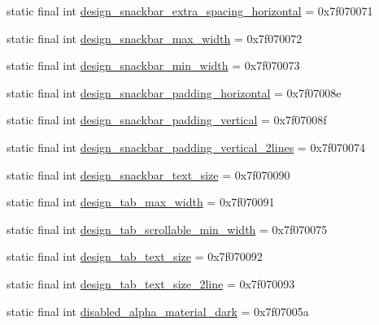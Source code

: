 \begin{CompactItemize}
\item 
static final int \hyperlink{classandroid_1_1support_1_1transition_1_1_r_1_1dimen_5ebad2bd37ab666c95fff511ee6636b7}{design\_\-snackbar\_\-extra\_\-spacing\_\-horizontal} = 0x7f070071
\item 
static final int \hyperlink{classandroid_1_1support_1_1transition_1_1_r_1_1dimen_a02014f40c29db95144e3f3e8d8f92e4}{design\_\-snackbar\_\-max\_\-width} = 0x7f070072
\item 
static final int \hyperlink{classandroid_1_1support_1_1transition_1_1_r_1_1dimen_9631affd0de312fd8cc56cbd449934b7}{design\_\-snackbar\_\-min\_\-width} = 0x7f070073
\item 
static final int \hyperlink{classandroid_1_1support_1_1transition_1_1_r_1_1dimen_b65c7898e9e3c80676fdcb000f5accf1}{design\_\-snackbar\_\-padding\_\-horizontal} = 0x7f07008e
\item 
static final int \hyperlink{classandroid_1_1support_1_1transition_1_1_r_1_1dimen_8cb554fc28af17eda83b8848c6c27c08}{design\_\-snackbar\_\-padding\_\-vertical} = 0x7f07008f
\item 
static final int \hyperlink{classandroid_1_1support_1_1transition_1_1_r_1_1dimen_4ea1e56c37b8ff5e5019e72d051429b9}{design\_\-snackbar\_\-padding\_\-vertical\_\-2lines} = 0x7f070074
\item 
static final int \hyperlink{classandroid_1_1support_1_1transition_1_1_r_1_1dimen_bf3cd2122839c0f8879ec2aa377a8c40}{design\_\-snackbar\_\-text\_\-size} = 0x7f070090
\item 
static final int \hyperlink{classandroid_1_1support_1_1transition_1_1_r_1_1dimen_de8b530feda19ef90b21416d142fe2fa}{design\_\-tab\_\-max\_\-width} = 0x7f070091
\item 
static final int \hyperlink{classandroid_1_1support_1_1transition_1_1_r_1_1dimen_b9d9d91766fb6e857956ad5469bd60af}{design\_\-tab\_\-scrollable\_\-min\_\-width} = 0x7f070075
\item 
static final int \hyperlink{classandroid_1_1support_1_1transition_1_1_r_1_1dimen_69603c05a14db0e4651bbc2f6cec96cb}{design\_\-tab\_\-text\_\-size} = 0x7f070092
\item 
static final int \hyperlink{classandroid_1_1support_1_1transition_1_1_r_1_1dimen_3831ef3ac13b6f2e67d15a053c4ea29c}{design\_\-tab\_\-text\_\-size\_\-2line} = 0x7f070093
\item 
static final int \hyperlink{classandroid_1_1support_1_1transition_1_1_r_1_1dimen_1d16c2af904aacbe47f32a8f26ad601f}{disabled\_\-alpha\_\-material\_\-dark} = 0x7f07005a
\item 

\end{CompactItemize}
